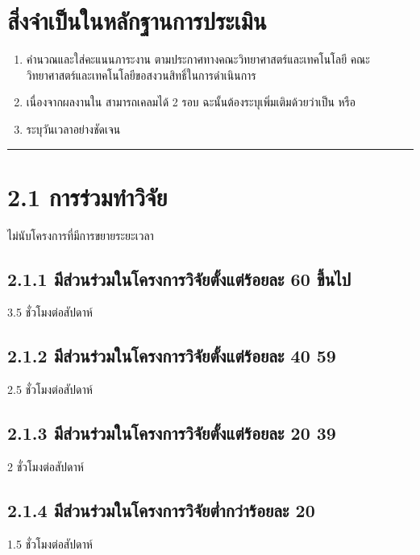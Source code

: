 \documentclass[a4paper,12pt,english]{sphinxmanual}
\begin{document}
\section{สิ่งจำเป็นในหลักฐานการประเมิน}
\label{\detokenize{2research:id3}}\begin{enumerate}
%
\item {} 
 คำนวณและใส่คะแนนภาระงาน ตามประกาศทางคณะวิทยาศาสตร์และเทคโนโลยี คณะวิทยาศาสตร์และเทคโนโลยีขอสงวนสิทธิ์ในการดำเนินการ

\item {} 
เนื่องจากผลงานใน {\hyperref[\detokenize{2research:id10}]{}} สามารถเคลมได้ 2 รอบ ฉะนั้นต้องระบุเพิ่มเติมด้วยว่าเป็น  หรือ 

\item {} 
ระบุวันเวลาอย่างชัดเจน

\end{enumerate}


\bigskip\hrule\bigskip



\section{2.1 การร่วมทำวิจัย}
\label{\detokenize{2research:id4}}
ไม่นับโครงการที่มีการขยายระยะเวลา


\subsection{2.1.1 มีส่วนร่วมในโครงการวิจัยตั้งแต่ร้อยละ 60 ขึ้นไป}
\label{\detokenize{2research:id5}}
3.5 ชั่วโมงต่อสัปดาห์


\subsection{2.1.2 มีส่วนร่วมในโครงการวิจัยตั้งแต่ร้อยละ 40 \sphinxhyphen{} 59}
\label{\detokenize{2research:id6}}
2.5 ชั่วโมงต่อสัปดาห์


\subsection{2.1.3 มีส่วนร่วมในโครงการวิจัยตั้งแต่ร้อยละ 20 \sphinxhyphen{} 39}
\label{\detokenize{2research:id7}}
2 ชั่วโมงต่อสัปดาห์


\subsection{2.1.4 มีส่วนร่วมในโครงการวิจัยต่ำกว่าร้อยละ 20}
\label{\detokenize{2research:id8}}
1.5 ชั่วโมงต่อสัปดาห์
\end{document}
